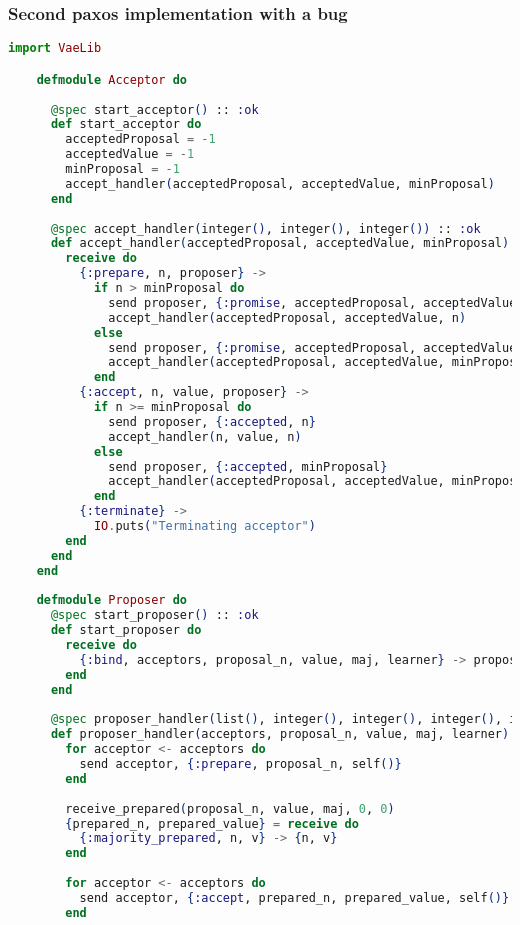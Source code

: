 \subsubsection{Second paxos implementation with a bug}
\begin{lstlisting}[language=Elixir, xleftmargin=.1\linewidth]
    import VaeLib

    defmodule Acceptor do
    
      @spec start_acceptor() :: :ok
      def start_acceptor do
        acceptedProposal = -1
        acceptedValue = -1
        minProposal = -1
        accept_handler(acceptedProposal, acceptedValue, minProposal)
      end
    
      @spec accept_handler(integer(), integer(), integer()) :: :ok
      def accept_handler(acceptedProposal, acceptedValue, minProposal) do
        receive do
          {:prepare, n, proposer} ->
            if n > minProposal do
              send proposer, {:promise, acceptedProposal, acceptedValue}
              accept_handler(acceptedProposal, acceptedValue, n)
            else
              send proposer, {:promise, acceptedProposal, acceptedValue}
              accept_handler(acceptedProposal, acceptedValue, minProposal)
            end
          {:accept, n, value, proposer} ->
            if n >= minProposal do
              send proposer, {:accepted, n}
              accept_handler(n, value, n)
            else
              send proposer, {:accepted, minProposal}
              accept_handler(acceptedProposal, acceptedValue, minProposal)
            end
          {:terminate} ->
            IO.puts("Terminating acceptor")
        end
      end
    end
    
    defmodule Proposer do
      @spec start_proposer() :: :ok
      def start_proposer do
        receive do
          {:bind, acceptors, proposal_n, value, maj, learner} -> proposer_handler(acceptors, proposal_n, value, maj, learner)
        end
      end
    
      @spec proposer_handler(list(), integer(), integer(), integer(), integer()) :: :ok
      def proposer_handler(acceptors, proposal_n, value, maj, learner) do
        for acceptor <- acceptors do
          send acceptor, {:prepare, proposal_n, self()}
        end
    
        receive_prepared(proposal_n, value, maj, 0, 0)
        {prepared_n, prepared_value} = receive do
          {:majority_prepared, n, v} -> {n, v}
        end
    
        for acceptor <- acceptors do
          send acceptor, {:accept, prepared_n, prepared_value, self()}
        end
    

\end{lstlisting}
